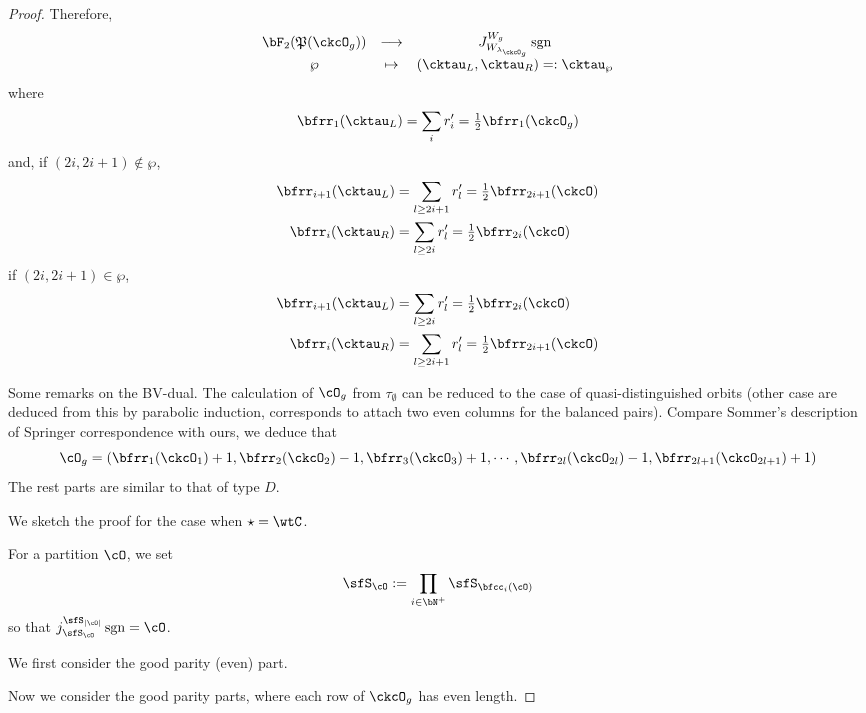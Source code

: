 \documentclass[12pt,a4paper]{amsart}
\def\abs#1{\left|{#1}\right|}
\newcommand{\sgn}{\operatorname{sgn}}
\numberwithin{equation}{section}
\theoremstyle{remark}
\def\half{{\tfrac{1}{2}}}
\def\lamckg{\lambda_{\ckcO_g}}
\def\CPP{\mathfrak{P}}
\begin{document}
\begin{proof}
{      Therefore,
      \[
        \begin{array}{ccc}
          \bF_{2}(\CPP(\ckcO_{g}))&\longrightarrow
          & J_{W_{\lamckg}}^{W_{g}} \sgn \\
          \wp&\mapsto&    (\cktau_{L},\cktau_{R}) =:\cktau_{\wp}
        \end{array}
      \]
      where
      \[
        \bfrr_{1}(\cktau_{L}) = \sum_{i} r'_{i} = \half \bfrr_{1}(\ckcO_{g})
      \]
      and, if $(2i,2i+1)\notin \wp$,
      \[
        \begin{split}
          \bfrr_{i+1}(\cktau_{L}) & = \sum_{l\geq 2i+1} r'_{l}
          = \half\bfrr_{2i+1}(\ckcO)\\
          \bfrr_{i}(\cktau_{R}) & = \sum_{l\geq 2i} r'_{l} = \half\bfrr_{2i}(\ckcO)
        \end{split}
      \]
      if $(2i,2i+1)\in \wp$,
      \[
        \begin{split}
          \bfrr_{i+1}(\cktau_{L}) & = \sum_{l\geq 2i} r'_{l}
          = \half\bfrr_{2i}(\ckcO)\\
          \bfrr_{i}(\cktau_{R}) & = \sum_{l\geq 2i+1} r'_{l} = \half\bfrr_{2i+1}(\ckcO)
        \end{split}
      \]

      Some remarks on the BV-dual. The calculation of $\cO_{g}$ from
      $\tau_{\emptyset}$ can be reduced to the case of quasi-distinguished
      orbits (other case are deduced from this by parabolic induction,
      corresponds to attach two even columns for the balanced pairs). Compare
      Sommer's description of Springer correspondence with ours, we deduce that
      \[
        \cO_{g} = (\bfrr_{1}(\ckcO_{1})+1,\bfrr_{2}(\ckcO_{2})-1,\bfrr_{3}(\ckcO_{3})+1, \cdots, \bfrr_{2l}(\ckcO_{2l})-1,\bfrr_{2l+1}(\ckcO_{2l+1})+1)
      \]
      The rest parts are similar to that of type $D$. }


    We sketch the proof for the case when $\star = \wtC$.


    For a partition $\cO$, we set
    \[
      \sfS_{\cO} := \prod_{i\in \bN^{+}}\sfS_{\bfcc_{i}(\cO)}
    \]
    so that $j_{\sfS_{\cO}}^{\sfS_{\abs{\cO}}}\sgn = \cO$.


    We first consider the good parity (even) part.

    Now we consider the good parity parts, where each row of $\ckcO_{g}$ has
    even length.


\end{proof}
\end{document}
